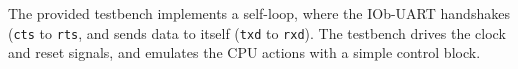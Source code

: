 The provided testbench implements a self-loop, where the IOb-UART handshakes
({\tt cts} to {\tt rts}, and sends data to itself ({\tt txd} to {\tt rxd}). The
testbench drives the clock and reset signals, and emulates the CPU actions with
a simple control block.
